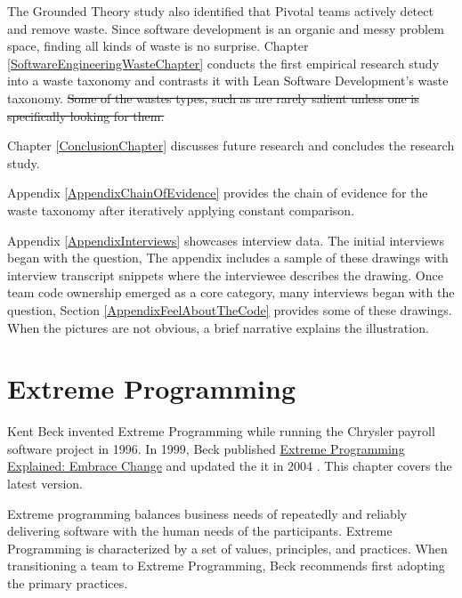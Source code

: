 The Grounded Theory study also identified that Pivotal teams actively detect and remove waste. Since software development is an organic and messy problem space, finding all kinds of waste is no surprise. Chapter \ref{SoftwareEngineeringWasteChapter} conducts the first empirical research study into a waste taxonomy and contrasts it with Lean Software Development's waste taxonomy. \sout{Some of the wastes types, such as  are rarely salient unless one is specifically looking for them.}

Chapter \ref{ConclusionChapter} discusses future research and concludes the research study. 

Appendix \ref{AppendixChainOfEvidence} provides the chain of evidence for the waste taxonomy after iteratively applying constant comparison. 

Appendix \ref{AppendixInterviews} showcases interview data. The initial interviews began with the question,  The appendix includes a sample of these drawings with interview transcript snippets where the interviewee describes the drawing. Once team code ownership emerged as a core category, many interviews began with the question,  Section \ref{AppendixFeelAboutTheCode} provides some of these drawings. When the pictures are not obvious, a brief narrative explains the illustration.


\chapter{Extreme Programming}
\label{ExtremeProgramming}

Kent Beck invented Extreme Programming while running the Chrysler payroll software project in 1996. \cite{BeckExtremeProgramming1999} In 1999, Beck published \underline{Extreme Programming Explained: Embrace Change}  \cite{BeckExtremeProgramming1999} and updated the it in 2004  \cite{BeckExtremeProgramming2004}. This chapter covers the latest version. 

Extreme programming balances business needs of repeatedly and reliably delivering software with the human needs of the participants. Extreme Programming is characterized by a set of values, principles, and practices. When transitioning a team to Extreme Programming, Beck recommends first adopting the primary practices. 
